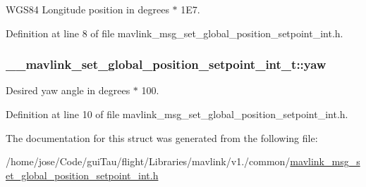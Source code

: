 W\-G\-S84 Longitude position in degrees $\ast$ 1\-E7. 



Definition at line 8 of file mavlink\-\_\-msg\-\_\-set\-\_\-global\-\_\-position\-\_\-setpoint\-\_\-int.\-h.

\hypertarget{struct____mavlink__set__global__position__setpoint__int__t_add86bfbf2c48e2ce222feaf301e9f7a4}{
\subsubsection[{yaw}]{ \-\_\-\-\_\-mavlink\-\_\-set\-\_\-global\-\_\-position\-\_\-setpoint\-\_\-int\-\_\-t\-::yaw}}\label{struct____mavlink__set__global__position__setpoint__int__t_add86bfbf2c48e2ce222feaf301e9f7a4}


Desired yaw angle in degrees $\ast$ 100. 



Definition at line 10 of file mavlink\-\_\-msg\-\_\-set\-\_\-global\-\_\-position\-\_\-setpoint\-\_\-int.\-h.



The documentation for this struct was generated from the following file\-:\begin{DoxyCompactItemize}
\item 
/home/jose/\-Code/gui\-Tau/flight/\-Libraries/mavlink/v1./common/\hyperlink{mavlink__msg__set__global__position__setpoint__int_8h}{mavlink\-\_\-msg\-\_\-set\-\_\-global\-\_\-position\-\_\-setpoint\-\_\-int.\-h}\end{DoxyCompactItemize}
